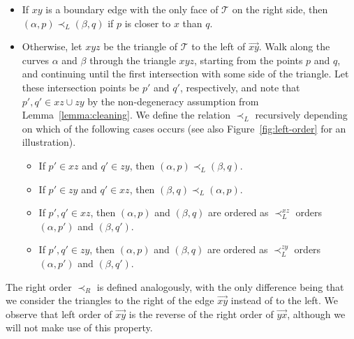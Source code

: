 \documentclass[11pt]{amsart}
\theoremstyle{definition}
\newcommand{\cT}{\mathcal{T}}
\begin{document}
\begin{itemize}
    \item If $xy$ is a boundary edge with the only face of $\cT$ on the right side, then $(\alpha, p)\prec_L (\beta, q)$ if $p$ is closer to $x$ than $q$.
    \item Otherwise, let $xyz$ be the triangle of $\cT$ to the left of $\vec{xy}$. 
    Walk along the curves $\alpha$ and $\beta$ through the triangle $xyz$, starting from the points $p$ and $q$, and continuing until the first intersection with some side of the triangle.
    Let these intersection points be $p'$ and $q'$, respectively, and note that $p',q'\in xz\cup zy$ by the non-degeneracy assumption from Lemma~\ref{lemma:cleaning}. 
    We define the relation $\prec_L$ recursively depending on which of the following cases occurs (see also Figure~\ref{fig:left-order} for an illustration).
    \begin{itemize}
        \item If $p'\in xz$ and $q'\in zy$, then $(\alpha, p)\prec_L (\beta, q)$.\smallskip
        \item If $p'\in zy$ and $q'\in xz$, then $(\beta, q)\prec_L (\alpha, p)$.\smallskip
        \item If $p',q'\in xz$, then $(\alpha,p)$ and $(\beta,q)$ are ordered as $\prec_L^{xz}$ orders $(\alpha,p')$ and $(\beta,q')$.\smallskip
        \item If $p',q'\in zy$, then $(\alpha,p)$ and $(\beta,q)$ are ordered as $\prec_L^{zy}$ orders $(\alpha,p')$ and $(\beta,q')$.
    \end{itemize}
\end{itemize}

The right order $\prec_R$ is defined analogously, with the only difference being that we consider the triangles to the right of the edge $\vec{xy}$ instead of to the left.
We observe that left order of $\vec{xy}$ is the reverse of the right order of $\vec{yx}$, although we will not make use of this property. 

\medskip
\end{document}
